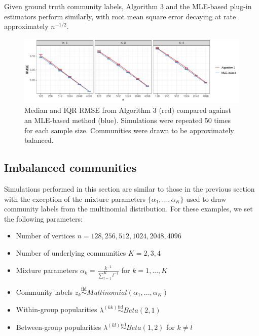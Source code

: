 \documentclass[12pt]{article}
\providecommand{\tightlist}{%
  \setlength{\itemsep}{0pt}\setlength{\parskip}{0pt}}
\begin{document}
Given ground truth community labels, Algorithm 3 and the MLE-based
plug-in estimators \cite{307cbeb9b1be48299388437423d94bf1}
\cite{noroozi2019estimation} perform similarly, with root mean square
error decaying at rate approximately \(n^{-1/2}\).

\begin{figure}[H]

{\centering \includegraphics{summary_files/figure-latex/lambda_est_k-1} 

}

\caption{Median and IQR RMSE from Algorithm 3 (red) compared against an MLE-based method (blue). Simulations were repeated 50 times for each sample size. Communities were drawn to be approximately balanced.}\label{fig:lambda_est_k}
\end{figure}

\hypertarget{imbalanced-communities}{%
\subsection{Imbalanced communities}\label{imbalanced-communities}}

Simulations performed in this section are similar to those in the
previous section with the exception of the mixture parameters
\(\{\alpha_1, ..., \alpha_K\}\) used to draw community labels from the
multinomial distribution. For these examples, we set the following
parameters:

\begin{itemize}
\tightlist
\item
  Number of vertices \(n = 128, 256, 512, 1024, 2048, 4096\)
\item
  Number of underlying communities \(K = 2, 3, 4\)
\item
  Mixture parameters \(\alpha_k = \frac{k^{-1}}{\sum_{l=1}^K l^{-1}}\)
  for \(k = 1, ..., K\)
\item
  Community labels
  \(z_k \stackrel{\text{iid}}{\sim}Multinomial(\alpha_1, ..., \alpha_K)\)
\item
  Within-group popularities
  \(\lambda^{(kk)} \stackrel{\text{iid}}{\sim}Beta(2, 1)\)
\item
  Between-group popularities
  \(\lambda^{(kl)} \stackrel{\text{iid}}{\sim}Beta(1, 2)\) for
  \(k \neq l\)
\end{itemize}
\end{document}
